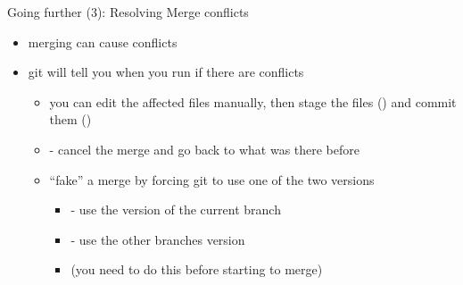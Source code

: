 \begin{frame}{Going further (3): Resolving Merge conflicts}
  \begin{itemize}
    \item merging can cause conflicts
    \item git will tell you when you run  if there are conflicts
    \begin{itemize}
      \item you can edit the affected files manually, then stage the files () and commit them ()
      \item {} - cancel the merge and go back to what was there before
      \item ``fake'' a merge by forcing git to use one of the two versions
      \begin{itemize}
        \item {} - use the version of the current branch
        \item {} - use the other branches version
        \item (you need to do this before starting to merge)
      \end{itemize}
    \end{itemize}
  \end{itemize}
\end{frame}